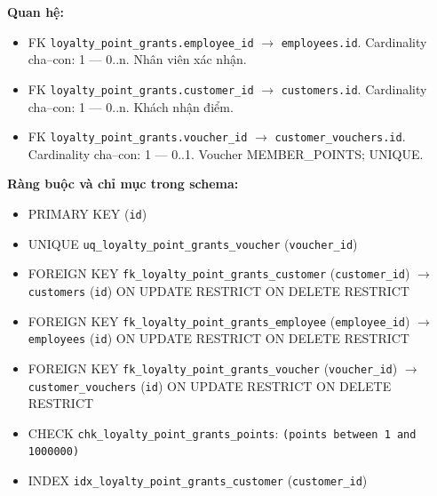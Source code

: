 \textbf{Quan hệ:}

\begin{itemize}

\item FK \texttt{loyalty\_point\_grants.employee\_id} $\rightarrow$ \texttt{employees.id}. Cardinality cha--con: 1 — 0..n. Nhân viên xác nhận.

\item FK \texttt{loyalty\_point\_grants.customer\_id} $\rightarrow$ \texttt{customers.id}. Cardinality cha--con: 1 — 0..n. Khách nhận điểm.

\item FK \texttt{loyalty\_point\_grants.voucher\_id} $\rightarrow$ \texttt{customer\_vouchers.id}. Cardinality cha--con: 1 — 0..1. Voucher MEMBER_POINTS; UNIQUE.

\end{itemize}

\textbf{Ràng buộc và chỉ mục trong schema:}

\begin{itemize}

\item PRIMARY KEY (\texttt{id})

\item UNIQUE \texttt{uq\_loyalty\_point\_grants\_voucher} (\texttt{voucher\_id})

\item FOREIGN KEY \texttt{fk\_loyalty\_point\_grants\_customer} (\texttt{customer\_id}) $\rightarrow$ \texttt{customers} (\texttt{id}) ON UPDATE RESTRICT ON DELETE RESTRICT

\item FOREIGN KEY \texttt{fk\_loyalty\_point\_grants\_employee} (\texttt{employee\_id}) $\rightarrow$ \texttt{employees} (\texttt{id}) ON UPDATE RESTRICT ON DELETE RESTRICT

\item FOREIGN KEY \texttt{fk\_loyalty\_point\_grants\_voucher} (\texttt{voucher\_id}) $\rightarrow$ \texttt{customer\_vouchers} (\texttt{id}) ON UPDATE RESTRICT ON DELETE RESTRICT

\item CHECK \texttt{chk\_loyalty\_point\_grants\_points}: \texttt{(points between 1 and 1000000)}

\item INDEX \texttt{idx\_loyalty\_point\_grants\_customer} (\texttt{customer\_id})

\end{itemize}

